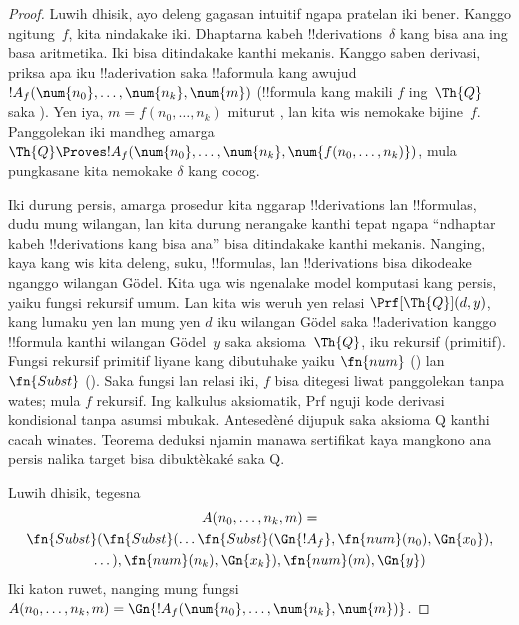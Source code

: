 \documentclass[../../../include/open-logic-section]{subfiles}
\begin{document}
\begin{proof}
Luwih dhisik, ayo deleng gagasan intuitif ngapa pratelan iki bener.
Kanggo ngitung~$f$, kita nindakake iki. Dhaptarna kabeh
!!{derivation}s~$\delta$ kang bisa ana ing basa aritmetika. Iki
bisa ditindakake kanthi mekanis. Kanggo saben derivasi, priksa apa iku
!!a{derivation} saka !!a{formula} kang awujud~$!A_f(\num{n_0}, \dots,
\num{n_k}, \num{m})$ (!!{formula} kang makili $f$ ing~$\Th{Q}$
saka ). Yen iya, $m = f(n_0, \dots, n_k)$ miturut
, lan kita wis nemokake bijine~$f$. Panggolekan iki
mandheg amarga $\Th{Q} \Proves !A_f(\num{n_0}, \dots, \num{n_k},
\num{f(n_0, \dots, n_k)})$, mula pungkasane kita nemokake $\delta$ kang
cocog.

Iki durung persis, amarga prosedur kita nggarap
!!{derivation}s lan !!{formula}s, dudu mung wilangan, lan kita
durung nerangake kanthi tepat ngapa ``ndhaptar kabeh !!{derivation}s
kang bisa ana'' bisa ditindakake kanthi mekanis. Nanging, kaya kang wis
kita deleng, suku, !!{formula}s, lan !!{derivation}s bisa dikodeake
nganggo wilangan G\"odel. Kita uga wis ngenalake model komputasi kang
persis, yaiku fungsi rekursif umum. Lan kita wis weruh yen relasi
$\Prf[\Th{Q}](d,y)$, kang lumaku yen lan mung yen $d$ iku wilangan
G\"odel saka !!a{derivation} kanggo !!{formula} kanthi wilangan
G\"odel~$y$ saka aksioma~$\Th{Q}$, iku rekursif (primitif). Fungsi
rekursif primitif liyane kang dibutuhake yaiku $\fn{num}$
() lan $\fn{Subst}$
(). Saka fungsi lan relasi iki,
$f$ bisa ditegesi liwat panggolekan tanpa wates; mula $f$ rekursif. Ing kalkulus aksiomatik, Prf nguji kode derivasi kondisional tanpa asumsi mbukak. Antesedèné dijupuk saka aksioma Q kanthi cacah winates. Teorema deduksi njamin manawa sertifikat kaya mangkono ana persis nalika target bisa dibuktèkaké saka Q.

Luwih dhisik, tegesna
\begin{multline*}
  A(n_0, \dots, n_k, m) = \\
  \fn{Subst}(\fn{Subst}(\dots\fn{Subst}(\Gn{!A_f}, \fn{num}(n_0), \Gn{x_0}),\\ \dots),
  \fn{num}(n_k),  \Gn{x_k}), \fn{num}(m), \Gn{y})
\end{multline*}
Iki katon ruwet, nanging mung fungsi $A(n_0, \dots, n_k,
m) = \Gn{!A_f(\num{n_0}, \dots, \num{n_k}, \num{m})}$.


\end{proof}
\end{document}
